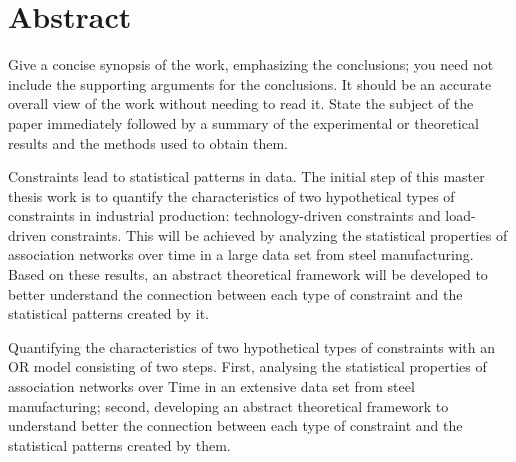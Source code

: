 \chapter*{Abstract}

{\color{red} 
	
	Give a concise synopsis of the work, emphasizing the conclusions; you need not include the	supporting arguments for the conclusions. It should be an
	accurate overall view of the work without needing to read it. State the subject of the paper immediately followed by a summary of the experimental or theoretical results and the methods used to obtain them.
	
	Constraints lead to statistical patterns in data. The initial step of this master thesis work is to quantify the characteristics of two hypothetical types of constraints in industrial production: technology-driven constraints and load-driven constraints. This will be achieved by analyzing the statistical properties of association networks over time in a large data set from steel manufacturing. Based on these results, an abstract theoretical framework will be developed to better understand the connection between each type of constraint and the statistical patterns created by it.

	Quantifying the characteristics of two hypothetical types of constraints with an OR model consisting of two steps. First, analysing the statistical properties of association networks over Time in an extensive data set from steel manufacturing; second, developing an abstract theoretical framework to understand better the connection between each type of constraint and the statistical patterns created by them. 
}
